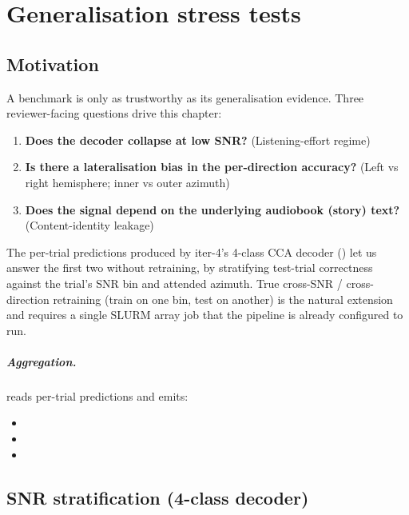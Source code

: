 \chapter{Generalisation stress tests}
\label{ch:generalisation}

\section{Motivation}

A benchmark is only as trustworthy as its generalisation evidence.
Three reviewer-facing questions drive this chapter:

\begin{enumerate}
  \item \textbf{Does the decoder collapse at low SNR?} (Listening-effort
        regime)
  \item \textbf{Is there a lateralisation bias in the per-direction
        accuracy?} (Left vs right hemisphere; inner vs outer azimuth)
  \item \textbf{Does the signal depend on the underlying audiobook
        (story) text?} (Content-identity leakage)
\end{enumerate}

The per-trial predictions produced by iter-4's 4-class CCA decoder
() let us answer the first
two without retraining, by stratifying test-trial correctness against
the trial's SNR bin and attended azimuth. True cross-SNR /
cross-direction retraining (train on one bin, test on another) is the
natural extension and requires a single SLURM array job that the
pipeline is already configured to run.

\paragraph{Aggregation.}
 reads per-trial
predictions and emits:
\begin{itemize}
  \item {}
  \item {}
  \item {}
\end{itemize}

\section{SNR stratification (4-class decoder)}

